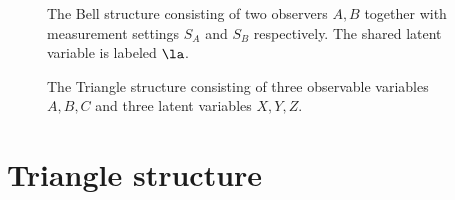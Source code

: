 \documentclass[aps, 10pt, english, twoside, pra, nofootinbib, tightenlines, longbibliography, superscriptaddress]{revtex4-1}
\begin{document}
    \begin{figure}
    \begin{nscenter}
        \begin{minipage}[t]{.48\textwidth}
            \centering
            \scalebox{1.0}{}
            \caption{The Bell structure consisting of two observers $A, B$ together with measurement settings $S_{A}$ and $S_{B}$ respectively. The shared latent variable is labeled $\la$.}
            \label{fig:bell_structure}
        \end{minipage}\hspace{0.04\textwidth}%
        \begin{minipage}[t]{.48\textwidth}
            \centering
            \scalebox{1.0}{}
            \caption{The Triangle structure consisting of three observable variables $A,B,C$ and three latent variables $X, Y, Z$.}
            \label{fig:triangle_structure}
        \end{minipage}
    \end{nscenter}
    \end{figure}


    \section{Triangle structure}
    \label{sec:triangle_structure}
\end{document}
